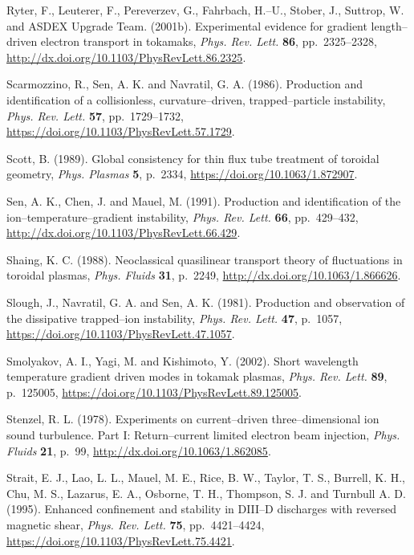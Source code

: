 \documentclass[a4paper,openany,12pt]{book}
\begin{document}
{\begin{thebibliography}{100}
\bibitem{}
Ryter, F., Leuterer, F., Pereverzev, G., Fahrbach, H.--U., Stober, J., Suttrop, W. and ASDEX Upgrade Team. (2001b). Experimental evidence for gradient length--driven electron transport in tokamaks, \emph{Phys. Rev. Lett.} 
\textbf{86}, pp.~2325--2328, \url{http://dx.doi.org/10.1103/PhysRevLett.86.2325}.

\bibitem{}
Scarmozzino, R., Sen, A. K. and Navratil, G. A. (1986). Production and identification of a collisionless, curvature--driven, trapped--particle instability, {\em Phys. Rev. Lett.} \textbf{57}, pp.~1729--1732, \url{https://doi.org/10.1103/PhysRevLett.57.1729}.

\bibitem{}
Scott, B. (1989). Global consistency for thin flux tube treatment of toroidal geometry,
 {\em Phys. Plasmas} \textbf{5}, p.~2334, \url{https://doi.org/10.1063/1.872907}.

\bibitem{}
Sen, A. K., Chen, J. and Mauel, M. (1991). Production and identification of the ion--temperature--gradient instability, \emph{Phys. Rev. Lett.} \textbf{66}, pp.~429--432, \url{http://dx.doi.org/10.1103/PhysRevLett.66.429}.

\bibitem{}
Shaing, K. C. (1988). Neoclassical quasilinear transport theory of fluctuations in toroidal plasmas, \emph{Phys. Fluids} \textbf{31}, p.~2249, \url{http://dx.doi.org/10.1063/1.866626}.

\bibitem{}
Slough, J., Navratil, G. A. and Sen, A. K. (1981). Production and observation of the dissipative trapped--ion instability,  {\em Phys. Rev. Lett.} \textbf{47}, p.~1057, \url{https://doi.org/10.1103/PhysRevLett.47.1057}.

\bibitem{}
Smolyakov, A. I., Yagi, M. and Kishimoto, Y. (2002). Short wavelength temperature gradient driven modes in tokamak plasmas, \emph{Phys. Rev. Lett.} \textbf{89}, 
p.~125005, \url{https://doi.org/10.1103/PhysRevLett.89.125005}.

\bibitem{}
Stenzel, R. L. (1978). Experiments on current--driven three--dimensional ion sound turbulence. Part I: Return--current limited electron beam injection, \emph{Phys. Fluids} \textbf{21}, p.~99, \url{http://dx.doi.org/10.1063/1.862085}.

\bibitem{}
Strait, E. J., Lao, L. L., Mauel, M. E., Rice, B. W., Taylor, T. S., Burrell, K. H., Chu, M. S., Lazarus, E. A., Osborne, T. H., Thompson, S. J. and Turnbull A. D. (1995). Enhanced confinement and stability in DIII--D discharges with reversed magnetic shear, \emph{Phys. Rev. Lett.} \textbf{75}, pp.~4421--4424, 
\url{https://doi.org/10.1103/PhysRevLett.75.4421}.


\end{thebibliography}}
\end{document}
